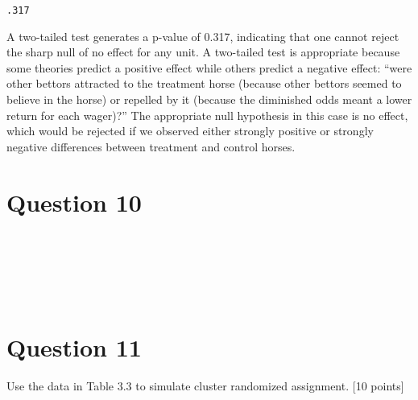 \documentclass[11pt,notitlepage]{article}\usepackage[]{graphicx}\usepackage[]{color}
\makeatletter
\newenvironment{kframe}{%
 \def\at@end@of@kframe{}%
 \ifinner\ifhmode%
  \def\at@end@of@kframe{\end{minipage}}%
  \begin{minipage}{\columnwidth}%
 \fi\fi%
 \def\FrameCommand##1{\hskip\@totalleftmargin \hskip-\fboxsep
 \colorbox{shadecolor}{##1}\hskip-\fboxsep
     \hskip-\linewidth \hskip-\@totalleftmargin \hskip\columnwidth}%
 \MakeFramed {\advance\hsize-\width
   \@totalleftmargin\z@ \linewidth\hsize
   \@setminipage}}%
 {\par\unskip\endMakeFramed%
 \at@end@of@kframe}
\newenvironment{knitrout}{}{} %
\makeatother
\begin{document}
\begin{enumerate}[a)]
\begin{knitrout}
\begin{kframe}
    \begin{Verbatim}[commandchars=\\\{\}]
.317

    \end{Verbatim}

\end{kframe}
\end{knitrout}
A two-tailed test generates a p-value of 0.317, indicating that one cannot reject the sharp null of no effect for any unit. A two-tailed test is appropriate because some theories predict a positive effect while others predict a negative effect: ``were other bettors attracted to the treatment horse (because other bettors seemed to believe in the horse) or repelled by it (because the diminished odds meant a lower return for each wager)?''  The appropriate null hypothesis in this case is no effect, which would be rejected if we observed either strongly positive or strongly negative differences between treatment and control horses.
\end{enumerate}

\section*{Question 10}
\begin{knitrout}
\color{fgcolor}\begin{kframe}
\begin{verbatim}






\end{verbatim}
\end{kframe}
\end{knitrout}

\section*{Question 11}

Use the data in Table 3.3 to simulate cluster randomized assignment. [10 points]
\end{document}
